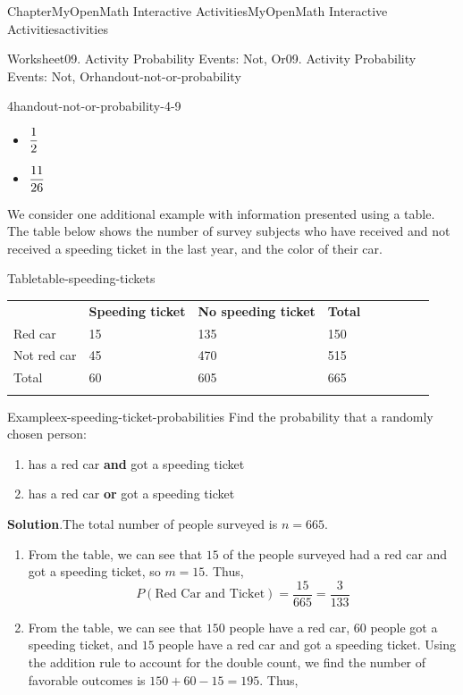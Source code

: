 \documentclass[oneside,10pt,]{book}
\newcommand{\blocktitlefont}{\relax}
\newcommand{\tabularfont}{\relax}
\newcommand{\ptxlistdisc}{\raisebox{0.3ex}{\textbullet}}
\newcommand{\terminology}[1]{\textbf{#1}}
\newcommand{\hrulethin}  {\noalign{\hrule height 0.04em}}
\begin{document}
\begin{chapterptx}{Chapter}{MyOpenMath Interactive Activities}{}{MyOpenMath Interactive Activities}{}{}{activities}
\begin{worksheet-section}{Worksheet}{09. Activity Probability Events: Not, Or}{}{09. Activity Probability Events: Not, Or}{}{}{handout-not-or-probability}
\begin{divisionexercise}{4}{}{}{handout-not-or-probability-4-9}
\begin{itemize}[label=\ptxlistdisc]
\item{}\(\displaystyle \displaystyle\frac{{1}}{{2}}\)%
\item{}\(\displaystyle \displaystyle\frac{{11}}{{26}}\)%
\end{itemize}
%
\end{divisionexercise}%
\clearpage
We consider one additional example with information presented using a table. The table below shows the number of survey subjects who have received and not received a speeding ticket in the last year, and the color of their car.%
\begin{tableptx}{Table}{\textbf{}}{table-speeding-tickets}{}%
\centering%
{\tabularfont%
\begin{tabular}{AlAlAlAlA}\hrulethin
{\bfseries{}}&{\bfseries{}Speeding ticket}&{\bfseries{}No speeding ticket}&{\bfseries{}Total}\tabularnewline\hrulethin
Red car&15&135&150\tabularnewline\hrulethin
Not red car&45&470&515\tabularnewline\hrulethin
Total&60&605&665\tabularnewline\hrulethin
\end{tabular}
}%
\end{tableptx}%
\begin{example}{Example}{}{ex-speeding-ticket-probabilities}%
Find the probability that a randomly chosen person:%
\begin{enumerate}[label={\alph*)}]
\item{}has a red car \terminology{and} got a speeding ticket%
\item{}has a red car \terminology{or} got a speeding ticket%
\end{enumerate}
%
\par\smallskip%
\noindent\textbf{\blocktitlefont Solution}.\hypertarget{ex-speeding-ticket-probabilities-2}{}\quad{}The total number of people surveyed is \(n = 665\).%
\par
%
\begin{enumerate}[label={\alph*)}]
\item{}From the table, we can see that \(15\) of the people surveyed had a red car and got a speeding ticket, so \(m = 15\). Thus,%
\begin{equation*}
P(\text{Red Car and Ticket}) = \frac{15}{665} = \frac{3}{133}
\end{equation*}
%
\item{}From the table, we can see that \(150\) people have a red car, \(60\) people got a speeding ticket, and \(15\) people have a red car and got a speeding ticket. Using the addition rule to account for the double count, we find the number of favorable outcomes is \(150 + 60 - 15 = 195\). Thus,%

\end{enumerate}
\end{example}
\end{worksheet-section}
\end{chapterptx}
\end{document}
